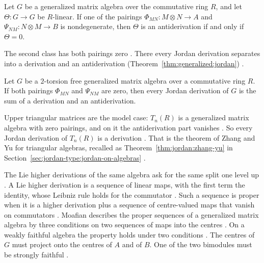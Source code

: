 \begin{proposition}\label{prop:generalized:no-antiderivation}
Let $G$ be a generalized matrix algebra over the commutative ring $R$, and let
$\Theta\colon G\to G$ be $R$-linear. If one of the pairings
$\Phi_{MN}\colon M\otimes N\to A$ and $\Psi_{NM}\colon N\otimes M\to B$ is
nondegenerate, then $\Theta$ is an antiderivation if and only if $\Theta=0$.
\end{proposition}

The second class has both pairings zero \cite[p.~13]{LiVanWykWei2012}. There every
Jordan derivation separates into a derivation and an antiderivation (Theorem~\ref{thm:generalized:jordan})
\cite[p.~13]{LiVanWykWei2012}.\begin{theorem}\label{thm:generalized:jordan}
Let $G$ be a $2$-torsion free generalized matrix algebra over a commutative ring
$R$. If both pairings $\Phi_{MN}$ and $\Psi_{NM}$ are zero, then every Jordan
derivation of $G$ is the sum of a derivation and an antiderivation.
\end{theorem}

Upper triangular matrices are the model case: $T_n(R)$ is a generalized matrix
algebra with zero pairings, and on it the antiderivation part vanishes
\cite[Example~3.13, p.~14]{LiVanWykWei2012}. So every Jordan derivation of
$T_n(R)$ is a derivation \cite[Example~3.13, p.~14]{LiVanWykWei2012}. That is the
theorem of Zhang and Yu for triangular algebras, recalled as
Theorem~\ref{thm:jordan:zhang-yu} in
Section~\ref{sec:jordan-type:jordan-on-algebras} \cite[p.~1]{ChengJing2007}.

The Lie higher derivations of the same algebra ask for the same split one level
up \cite[p.~8]{Moafian2017}. A Lie higher derivation is a sequence of
linear maps, with the first term the identity, whose Leibniz rule holds for the
commutator \cite[p.~1]{Moafian2017}. Such a sequence is proper when it
is a higher derivation plus a sequence of centre-valued maps that vanish on
commutators \cite[p.~1]{Moafian2017}. Moafian describes the proper
sequences of a generalized matrix algebra by three conditions on two sequences
of maps into the centres \cite[Theorem~3.1, p.~8]{Moafian2017}. On a
weakly faithful algebra the property holds under two conditions
\cite[Theorem~4.3, p.~12]{Moafian2017}. The centres of $G$ must
project onto the centres of $A$ and of $B$. One of the two bimodules must be
strongly faithful \cite[Theorem~4.3, p.~12]{Moafian2017}.

